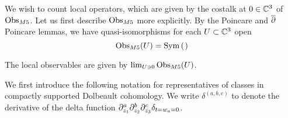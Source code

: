 \documentclass[11pt]{amsart}
\begin{document}
\parsec

%

We wish to count local operators, which are given by the costalk at $0\in \mathbb{C}^{3}$ of ${\rm Obs}_{M5}$. Let us first describe ${\rm Obs}_{M5}$ more explicitly. By the Poincare and $\overline{\partial}$ Poincare lemmas, we have quasi-isomorphisms for each $U\subset \mathbb{C}^{3}$ open
\[
\Obs_{M5}(U) = \Sym \left( \begin{tikzcd}  \end{tikzcd} \right)
\]

The local observables are given by $\lim _{U\ni 0} {\rm Obs}_{M5}(U)$.

We first introduce the following notation for representatives of classes in compactly supported Dolbeault cohomology. We write $\delta^{(a,b,c)}$ to denote the derivative of the delta function $\partial_{z_{1}}^{a}\partial_{z_{2}}^{b}\partial_{z_{3}}^{c}\delta_{t=w_{a}=0}$.
\end{document}
